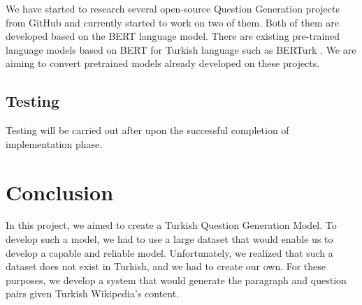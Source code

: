 \documentclass{mefsdp}
\begin{document}
	We have started to research several open-source Question Generation projects from GitHub and currently started to work on two of them. Both of them are developed based on the BERT language model. There are existing pre-trained language models based on BERT for Turkish language such as BERTurk \cite{stefan_schweter_2020_3770924}. We are aiming to convert pretrained models already developed on these projects.
	
	\subsection{Testing}
	Testing will be carried out after upon the successful completion of implementation phase.
	
	\section{Conclusion}
	In this project, we aimed to create a Turkish Question Generation Model. To develop such a model, we had to use a large dataset that would enable us to develop a capable and reliable model. Unfortunately, we realized that such a dataset does not exist in Turkish, and we had to create our own. For these purposes, we develop a system that would generate the paragraph and question pairs given Turkish Wikipedia's content. \newline \par
	
\end{document}
